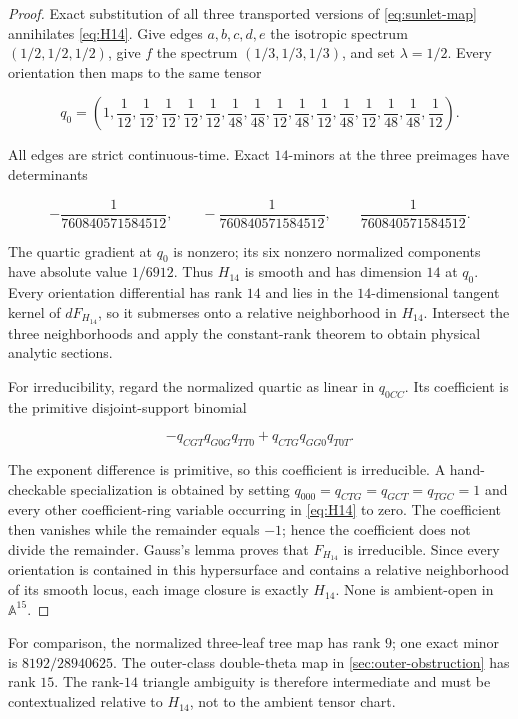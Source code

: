 \begin{proof}
Exact substitution of all three transported versions of
\eqref{eq:sunlet-map} annihilates \eqref{eq:H14}.  Give edges
\(a,b,c,d,e\) the isotropic spectrum \((1/2,1/2,1/2)\), give \(f\) the
spectrum \((1/3,1/3,1/3)\), and set \(\lambda=1/2\).  Every orientation then
maps to the same tensor

\[
q_0=\left(1,\frac1{12},\frac1{12},\frac1{12},
\frac1{12},\frac1{12},\frac1{48},\frac1{48},
\frac1{12},\frac1{48},\frac1{12},\frac1{48},
\frac1{12},\frac1{48},\frac1{48},\frac1{12}\right).
\]

All edges are strict continuous-time.  Exact \(14\)-minors at the three
preimages have determinants

\[
 -\frac1{760840571584512},\qquad
 -\frac1{760840571584512},\qquad
  \frac1{760840571584512}.
\]

The quartic gradient at \(q_0\) is nonzero; its six nonzero normalized
components have absolute value \(1/6912\).  Thus \(H_{14}\) is smooth and
has dimension \(14\) at \(q_0\).  Every orientation differential has rank
\(14\) and lies in the \(14\)-dimensional tangent kernel of \(dF_{H_{14}}\),
so it submerses onto a relative neighborhood in \(H_{14}\).  Intersect the
three neighborhoods and apply the constant-rank theorem to obtain physical
analytic sections.

For irreducibility, regard the normalized quartic as linear in \(q_{0CC}\).
Its coefficient is the primitive disjoint-support binomial

\[
 -q_{CGT}q_{G0G}q_{TT0}+q_{CTG}q_{GG0}q_{T0T}.
\]

The exponent difference is primitive, so this coefficient is irreducible.
A hand-checkable specialization is obtained by setting
\(q_{000}=q_{CTG}=q_{GCT}=q_{TGC}=1\) and every other coefficient-ring
variable occurring in \eqref{eq:H14} to zero.  The coefficient then vanishes
while the remainder equals \(-1\); hence the coefficient does not divide the
remainder.  Gauss's lemma proves that \(F_{H_{14}}\) is irreducible.  Since
every orientation is contained in this hypersurface and contains a relative
neighborhood of its smooth locus, each image closure is exactly \(H_{14}\).
None is ambient-open in \(\mathbb A^{15}\).
\end{proof}

For comparison, the normalized three-leaf tree map has rank \(9\); one exact
minor is \(8192/28940625\).  The outer-class double-theta map in
\cref{sec:outer-obstruction} has rank \(15\).  The rank-\(14\) triangle
ambiguity is therefore intermediate and must be contextualized relative to
\(H_{14}\), not to the ambient tensor chart.

